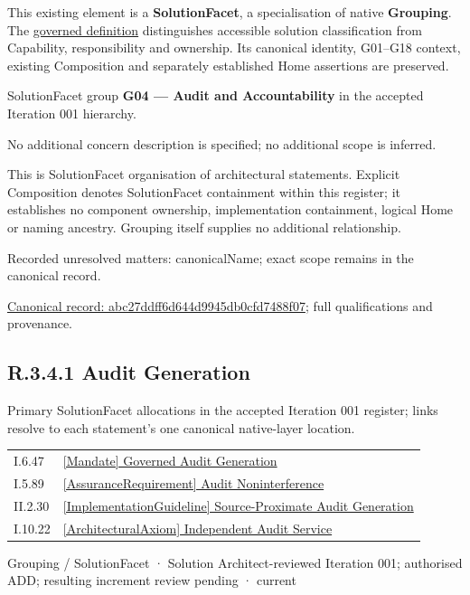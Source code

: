 This existing element is a \textbf{SolutionFacet}, a specialisation of native
\textbf{Grouping}. The \href{\detokenize{../../../../../../../governance/continuum-representation.md#solutionfacet-classification--1119-candidate}}{governed definition}
distinguishes accessible solution classification from Capability, responsibility
and ownership. Its canonical identity, G01–G18 context, existing Composition
and separately established Home assertions are preserved.



SolutionFacet group \textbf{G04 — Audit and Accountability} in the accepted Iteration 001 hierarchy.



No additional concern description is specified; no additional scope is inferred.



This is SolutionFacet organisation of architectural statements. Explicit Composition denotes SolutionFacet containment within this register; it establishes no component ownership, implementation containment, logical Home or naming ancestry. Grouping itself supplies no additional relationship.


{\small Recorded unresolved matters: canonicalName; exact scope remains in the canonical record.}\par
{\footnotesize \href{../../../../../../../continuum/grouping/abc27ddff6d644d9945db0cfd7488f07.md}{Canonical record: abc27ddff6d644d9945db0cfd7488f07}; full qualifications and provenance.}\par
\subsection*{R.3.4.1 Audit Generation}
\label{navigation:R.3.4.1}

Primary SolutionFacet allocations in the accepted Iteration 001 register; links resolve to each statement’s one canonical native-layer location.\par
\begin{longtable}{p{.22\linewidth}p{.73\linewidth}}
I.6.47 & \hyperref[element:d388ee6fb1d24ca886b2802cfb42c30e]{[Mandate] Governed Audit Generation} \\
I.5.89 & \hyperref[element:ccea3a4dbd494cbe99c525ff2e87db26]{[AssuranceRequirement] Audit Noninterference} \\
II.2.30 & \hyperref[element:427d41b9416943d4a362470a965baea5]{[ImplementationGuideline] Source-Proximate Audit Generation} \\
I.10.22 & \hyperref[element:41fa01556ade4f22a35288b072113767]{[ArchitecturalAxiom] Independent Audit Service} \\
\end{longtable}
\label{element:40416671099a46678ac5dfc3d0d615cf}
{\small Grouping / SolutionFacet · Solution Architect-reviewed Iteration 001; authorised ADD; resulting increment review pending · current}\par


